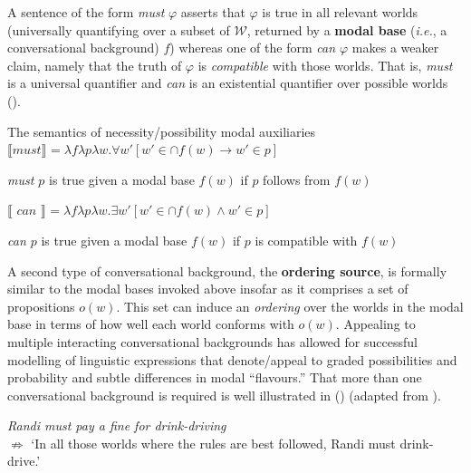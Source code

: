 \documentclass[12pt,dvipsnames]{report}
\providecommand{\denote}[2][]{\ensuremath{\llbracket{#2}\rrbracket^{#1}}}
\begin{document}
 A sentence of the form \textit{must} $ \varphi $ asserts that $ \varphi $ is true in all relevant worlds (universally quantifying over a subset of $ \mathcal W $, returned by a \textbf{modal base} (\textit{i.e.}, a conversational background) $ f $) whereas one of the form \textit{can $ \varphi $} makes a weaker claim, namely that the truth of $ \varphi $ is \textit{compatible} with those worlds. That is, \textit{must} is a universal quantifier and \textit{can} is an existential quantifier over possible worlds (\nextx). %

\pex The semantics of necessity/possibility modal auxiliaries \citep[adapting from][346]{Kratzer1977}
\a $ \denote{\textit{must}}=\lambda f\lambda p\lambda w.\forall w'[w'\in\cap f(w)\to w'\in p] $

\textit{must $ p $} is true given a modal base $ f(w) $ if $ p $ follows from $ f(w) $


\a $ \denote{\textit{~can~}}=\lambda f\lambda p\lambda w.\exists w'[w'\in\cap f(w)\wedge w'\in p] $

\textit{can $ p $} is true given a modal base $ f(w) $ if $ p $ is compatible with $ f(w) $

\xe

A second type of conversational background, the \textbf{ordering source}, is formally similar to the modal bases invoked above insofar as it comprises a set of propositions $ o(w) $. This set can induce an \textit{ordering} over the worlds in the modal base in terms of how well each world conforms with $ o(w) $. Appealing to multiple interacting conversational backgrounds has allowed for successful modelling of linguistic expressions that denote/appeal to graded possibilities and probability and subtle differences in modal ``flavours.'' That more than one conversational background is required is well illustrated in (\nextx) (adapted from \citealp*{Kaufmann2006}).

\pex \textit{Randi must pay a fine for drink-driving}\\ $ \boldsymbol{\not\Rightarrow }$ `In all those worlds where the rules are best followed, Randi must drink-drive.'\xe
\end{document}
